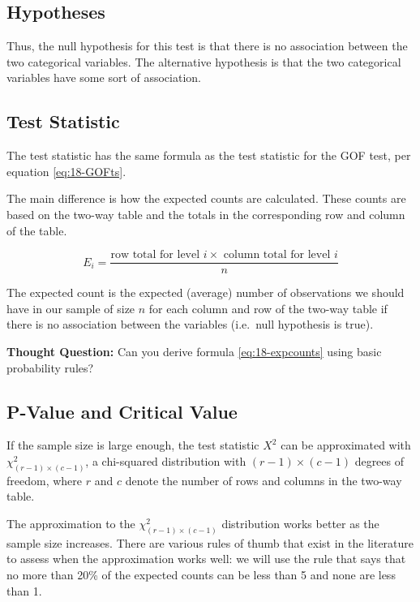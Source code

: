 \documentclass[
]{book}
\theoremstyle{definition}
\theoremstyle{definition}
\theoremstyle{definition}
\theoremstyle{definition}
\theoremstyle{remark}
\begin{document}
\hypertarget{hypotheses-2}{%
\subsection{Hypotheses}\label{hypotheses-2}}

Thus, the null hypothesis for this test is that there is no association between the two categorical variables. The alternative hypothesis is that the two categorical variables have some sort of association.

\hypertarget{test-statistic-4}{%
\subsection{Test Statistic}\label{test-statistic-4}}

The test statistic has the same formula as the test statistic for the GOF test, per equation \eqref{eq:18-GOFts}.

The main difference is how the expected counts are calculated. These counts are based on the two-way table and the totals in the corresponding row and column of the table.

\begin{equation} 
E_i = \frac{\text{row total for level }i \times \text{ column total for level }i}{n}
\label{eq:18-expcounts}
\end{equation}

The expected count is the expected (average) number of observations we should have in our sample of size \(n\) for each column and row of the two-way table if there is no association between the variables (i.e.~null hypothesis is true).

\textbf{Thought Question:} Can you derive formula \eqref{eq:18-expcounts} using basic probability rules?

\hypertarget{p-value-and-critical-value-1}{%
\subsection{P-Value and Critical Value}\label{p-value-and-critical-value-1}}

If the sample size is large enough, the test statistic \(X^2\) can be approximated with \(\chi^2_{(r-1) \times (c-1)}\), a chi-squared distribution with \((r-1) \times (c-1)\) degrees of freedom, where \(r\) and \(c\) denote the number of rows and columns in the two-way table.

The approximation to the \(\chi^2_{(r-1) \times (c-1)}\) distribution works better as the sample size increases. There are various rules of thumb that exist in the literature to assess when the approximation works well: we will use the rule that says that no more than 20\% of the expected counts can be less than 5 and none are less than 1.
\end{document}
